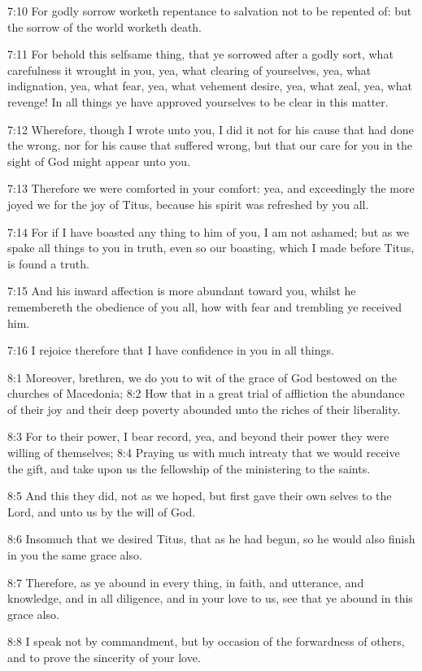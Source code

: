 7:10 For godly sorrow worketh repentance to salvation not to be repented of: but the sorrow of the world worketh death.

7:11 For behold this selfsame thing, that ye sorrowed after a godly sort, what carefulness it wrought in you, yea, what clearing of yourselves, yea, what indignation, yea, what fear, yea, what vehement desire, yea, what zeal, yea, what revenge! In all things ye have approved yourselves to be clear in this matter.

7:12 Wherefore, though I wrote unto you, I did it not for his cause that had done the wrong, nor for his cause that suffered wrong, but that our care for you in the sight of God might appear unto you.

7:13 Therefore we were comforted in your comfort: yea, and exceedingly the more joyed we for the joy of Titus, because his spirit was refreshed by you all.

7:14 For if I have boasted any thing to him of you, I am not ashamed; but as we spake all things to you in truth, even so our boasting, which I made before Titus, is found a truth.

7:15 And his inward affection is more abundant toward you, whilst he remembereth the obedience of you all, how with fear and trembling ye received him.

7:16 I rejoice therefore that I have confidence in you in all things.

8:1 Moreover, brethren, we do you to wit of the grace of God bestowed on the churches of Macedonia; 8:2 How that in a great trial of affliction the abundance of their joy and their deep poverty abounded unto the riches of their liberality.

8:3 For to their power, I bear record, yea, and beyond their power they were willing of themselves; 8:4 Praying us with much intreaty that we would receive the gift, and take upon us the fellowship of the ministering to the saints.

8:5 And this they did, not as we hoped, but first gave their own selves to the Lord, and unto us by the will of God.

8:6 Insomuch that we desired Titus, that as he had begun, so he would also finish in you the same grace also.

8:7 Therefore, as ye abound in every thing, in faith, and utterance, and knowledge, and in all diligence, and in your love to us, see that ye abound in this grace also.

8:8 I speak not by commandment, but by occasion of the forwardness of others, and to prove the sincerity of your love.

